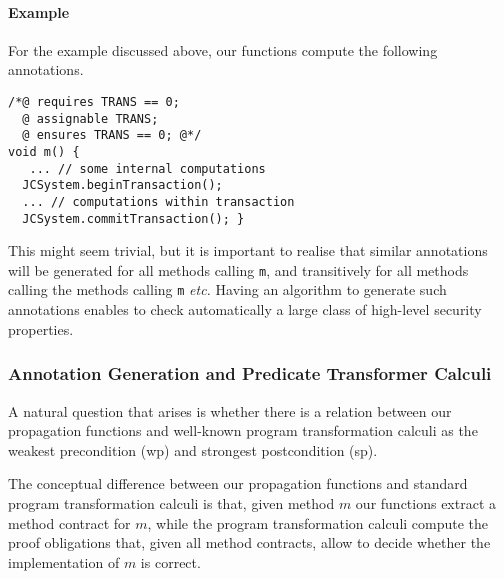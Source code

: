 \paragraph{Example}
For the example discussed above, our functions compute the following
annotations.

\begin{verbatim}
/*@ requires TRANS == 0;
  @ assignable TRANS;
  @ ensures TRANS == 0; @*/
void m() { 
   ... // some internal computations
  JCSystem.beginTransaction();
  ... // computations within transaction
  JCSystem.commitTransaction(); }
\end{verbatim}
This might seem trivial, but it is important to realise that similar
annotations will be generated for all methods calling
\texttt{m}, and transitively for all methods calling the methods
calling \texttt{m} \emph{etc.}
Having an algorithm to generate such annotations enables to check
automatically a large class of high-level security properties.

\subsubsection{Annotation Generation and Predicate Transformer Calculi}
A natural question that arises is whether there is a relation between
our propagation functions and well-known program transformation calculi as
the weakest precondition (\textsf{wp}) and strongest postcondition
(\textsf{sp}).

The conceptual difference between our propagation functions and
standard program transformation calculi is that, given method \(m\)
our functions extract a method contract for \(m\), while the program
transformation calculi compute the proof obligations that, given all
method contracts, allow to decide whether the implementation of \(m\)
is correct.


